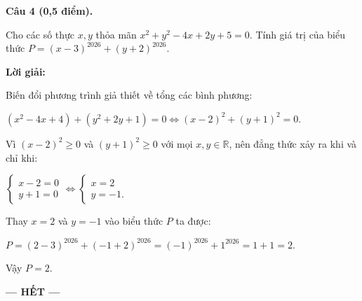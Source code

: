\documentclass[12pt,a4paper]{article}
\begin{document}
\vspace{3mm}
\noindent\textbf{Câu 4 (0,5 điểm).}

Cho các số thực $x, y$ thỏa mãn $x^2 + y^2 - 4x + 2y + 5 = 0$. Tính giá trị của biểu thức $P = (x - 3)^{2026} + (y + 2)^{2026}$.

\noindent\textbf{Lời giải:}

Biến đổi phương trình giả thiết về tổng các bình phương:\par $(x^2 - 4x + 4) + (y^2 + 2y + 1) = 0 \iff (x - 2)^2 + (y + 1)^2 = 0$.\par Vì $(x - 2)^2 \ge 0$ và $(y + 1)^2 \ge 0$ với mọi $x, y \in \mathbb{R}$, nên đẳng thức xảy ra khi và chỉ khi:\par $\begin{cases} x - 2 = 0 \\ y + 1 = 0 \end{cases} \iff \begin{cases} x = 2 \\ y = -1. \end{cases}$\par Thay $x = 2$ và $y = -1$ vào biểu thức $P$ ta được:\par $P = (2 - 3)^{2026} + (-1 + 2)^{2026} = (-1)^{2026} + 1^{2026} = 1 + 1 = 2$.\par Vậy $P = 2$.

\vspace{3mm}

\vfill
\begin{center}
  \textbf{--- HẾT ---}
\end{center}
\end{document}
